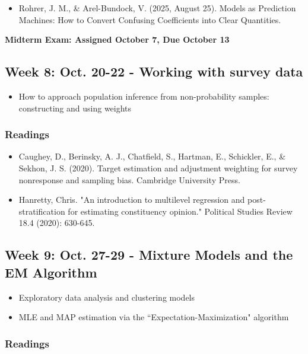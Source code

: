 \documentclass[11pt, article, oneside]{memoir}
\theoremstyle{Assumption}
\begin{document}
\begin{itemize}
\item Rohrer, J. M., \& Arel-Bundock, V. (2025, August 25). Models as Prediction Machines: How to Convert Confusing Coefficients into Clear Quantities. 
\end{itemize}

\textbf{Midterm Exam: Assigned October 7, Due October 13}

\subsection{Week 8: Oct. 20-22 - Working with survey data}

\begin{itemize}
\item How to approach population inference from non-probability samples: constructing and using weights
\end{itemize}

\subsubsection*{Readings}

\begin{itemize}
\item Caughey, D., Berinsky, A. J., Chatfield, S., Hartman, E., Schickler, E., \& Sekhon, J. S. (2020). Target estimation and adjustment weighting for survey nonresponse and sampling bias. Cambridge University Press.
\item Hanretty, Chris. "An introduction to multilevel regression and post-stratification for estimating constituency opinion." Political Studies Review 18.4 (2020): 630-645.
\end{itemize}

\subsection{Week 9: Oct. 27-29 - Mixture Models and the EM Algorithm}

\begin{itemize}
\item Exploratory data analysis and clustering models
\item MLE and MAP estimation via the ``Expectation-Maximization" algorithm
\end{itemize}

\subsubsection*{Readings}
\end{document}
